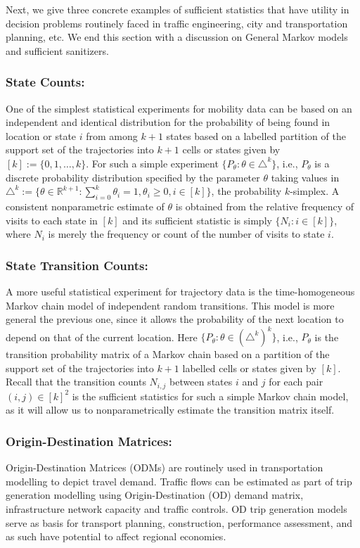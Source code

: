 \documentclass[review]{elsarticle}
\begin{document}
Next, we give three concrete examples of sufficient statistics that have utility in decision problems routinely faced in traffic engineering, city and transportation planning, etc.  
We end this section with a discussion on General Markov models and sufficient sanitizers.

\subsubsection{State Counts:}
One of the simplest statistical experiments for mobility data can be based on an independent and identical distribution for the probability of being found in location or state $i$ from among $k+1$ states based on a labelled partition of the support set of the trajectories into $k+1$ cells or states given by $[k] := \{0,1,\ldots,k\}$.  
For such a simple experiment $\{P_{\theta}: \theta \in \triangle^k \}$, i.e., $P_{\theta}$ is a discrete probability distribution specified by the 
parameter $\theta$ taking values in 
$\triangle^k := \{ \theta \in \mathbb{R}^{k+1} : \sum_{i=0}^k \theta_i = 1, \theta_i \geq 0, i \in [k] \}$, 
the probability $k$-simplex. 
A consistent nonparametric estimate of $\theta$ is obtained from the relative frequency of visits to each state in $[k]$ and its sufficient statistic is simply $\{N_i: i \in [k]\}$, where $N_i$ is merely the frequency or count of the number of visits to state $i$.  

\subsubsection{State Transition Counts:}
A more useful statistical experiment for trajectory data is the time-homogeneous Markov chain model of independent random transitions. This model is more general the previous one, since it allows the probability of the next location to depend on that of the current location.   
Here $\{P_{\theta}: \theta \in (\triangle^k)^k\}$, i.e., $P_{\theta}$ is the transition probability matrix of a Markov chain based on a partition of the support set of the trajectories into $k+1$ labelled cells or states given by $[k]$.  
Recall that the transition counts $N_{i,j}$ between states $i$ and $j$ for each pair $(i,j) \in [k]^2$ is the sufficient statistics for such a simple Markov chain model, as it will allow us to nonparametrically estimate the transition matrix itself.  

\subsubsection{Origin-Destination Matrices:}
Origin-Destination Matrices (ODMs) are routinely used in transportation modelling to depict travel demand.  
Traffic flows can be estimated as part of trip generation modelling using Origin-Destination (OD) demand matrix, infrastructure network capacity and traffic controls. 
OD trip generation models serve as basis for transport planning, construction, performance assessment, and as such have potential to affect regional economies. 
\end{document}
